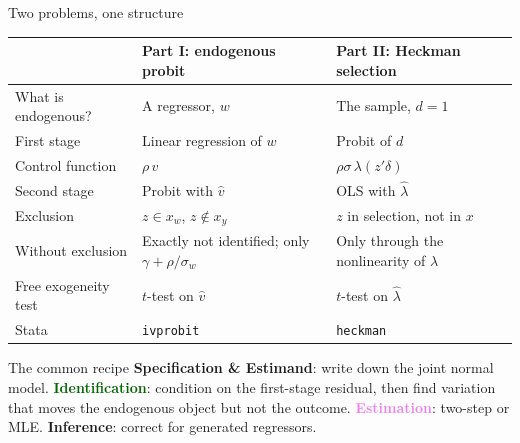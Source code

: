 \documentclass[aspectratio=169,11pt]{beamer}
\newcommand{\Spec}{\textcolor{DeepBlue}{\textbf{Specification \& Estimand}}}
\newcommand{\Ident}{\textcolor{DarkGreen}{\textbf{Identification}}}
\newcommand{\Est}{\textcolor{violet}{\textbf{Estimation}}}
\newcommand{\Infer}{\textcolor{orange!80!black}{\textbf{Inference}}}
\newcommand{\Mills}{\lambda}
\begin{document}
\begin{frame}{Two problems, one structure}

\small

\begin{tabular}{B{0.21\textwidth} L{0.34\textwidth} L{0.36\textwidth}}
\toprule
& Part I: endogenous probit & Part II: Heckman selection\\
\midrule
What is endogenous? & A regressor, $w$ & The sample, $d=1$\\[0.1em]
First stage & Linear regression of $w$ & Probit of $d$\\[0.1em]
Control function & $\rho\,v$ & $\rho\sigma\,\Mills(z'\delta)$\\[0.1em]
Second stage & Probit with $\hat v$ & OLS with $\hat\Mills$\\[0.1em]
Exclusion & $z\in x_w$, $z\notin x_y$ & $z$ in selection, not in $x$\\[0.1em]
Without exclusion & Exactly not identified; only $\gamma+\rho/\sigma_w$ &
  Only through the nonlinearity of $\Mills$\\[0.1em]
Free exogeneity test & $t$-test on $\hat v$ & $t$-test on $\hat\Mills$\\[0.1em]
Stata & \texttt{ivprobit} & \texttt{heckman}\\
\bottomrule
\end{tabular}

\vspace{0.1em}

\begin{block}{The common recipe}
\Spec: write down the joint normal model.
\Ident: condition on the first-stage residual, then find variation
that moves the endogenous object but not the outcome.
\Est: two-step or MLE.
\Infer: correct for generated regressors.
\end{block}

\end{frame}
\end{document}
